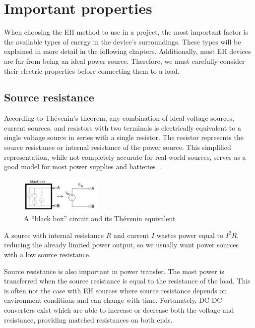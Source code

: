 \documentclass[a4paper,10pt]{article}
\begin{document}
\section{Important properties}

When choosing the \ac{EH} method to use in a project, the most important factor is the available types of energy in the device's surroundings. These types will be explained in more detail in the following chapters. Additionally, most \ac{EH} devices are far from being an ideal power source. Therefore, we must carefully consider their electric properties before connecting them to a load. 

\subsection{Source resistance}

According to Th\'evenin's theorem, any combination of ideal voltage sources, current sources, and resistors with two terminals is electrically equivalent to a single voltage source in series with a single resistor. The resistor represents the source resistance or internal resistance of the power source. This simplified representation, while not completely accurate for real-world sources, serves as a good model for most power supplies and batteries~\cite{wiki:thevenin}. 

\begin{figure}[h]
\centering
  \includegraphics[width=150px]{./Slike/Thevenin_equivalent}
  \caption{A ``black box'' circuit and its Th\'evenin equivalent~\cite{wiki:thevenin}}
\label{fig:thevenin}
\end{figure}

A source with internal resistance $R$ and current $I$ wastes power equal to $I^2 R$, reducing the already limited power output, so we usually want power sources with a low source resistance. 

Source resistance is also important in power transfer. The most power is transferred when the source resistance is equal to the resistance of the load. This is often not the case with \ac{EH} sources where source resistance depends on environment conditions and can change with time. Fortunately, DC-DC converters exist which are able to increase or decrease both the voltage and resistance, providing matched resistances on both ends. 
\end{document}
